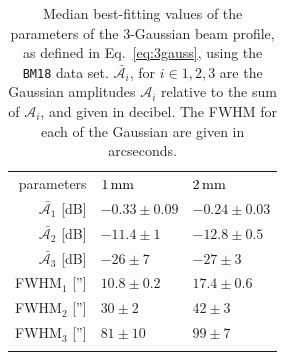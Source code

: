 \begin{table}[!th]
   \caption{{\lp Median best-fitting values of the parameters of the
  3-Gaussian beam profile, as defined in Eq.~\ref{eq:3gauss}, using
  the {\tt BM18} data set. $\bar{\mathcal{A}_i}$, for
  $i \in {1, 2, 3}$ are the Gaussian amplitudes $\mathcal{A}_i$ relative to the sum
  of $\mathcal{A}_i$, and given in decibel. The FWHM for each of the Gaussian are given in arcseconds.}}
  \label{tab:mean_3gauss_fit}
  \begin{center}
    \begin{tabular}{rll}
      \hline\hline
      \noalign{\smallskip}
       parameters  &  $1\,\rm{mm}$  & $2\,\rm{mm}$ \\
       \noalign{\smallskip} 
      \hline
      \noalign{\smallskip} 
      $\bar{\mathcal{A}_1}$ [dB] &   $-0.33 \pm 0.09$   &  $-0.24 \pm 0.03$ \\
      $\bar{\mathcal{A}_2}$ [dB] &   $-11.4 \pm 1$     &  $-12.8 \pm 0.5$   \\
      $\bar{\mathcal{A}_3}$ [dB] &   $-26 \pm 7$       &  $-27 \pm 3$    \\
      FWHM$_1$  ['']             &   $10.8 \pm 0.2$    &  $17.4 \pm 0.6 $ \\
      FWHM$_2$  ['']             &   $30 \pm 2$        &  $42 \pm 3 $ \\
      FWHM$_3$  ['']             &   $81 \pm 10$       &  $99 \pm 7 $ \\     
       \noalign{\smallskip}   
      \hline
    \end{tabular}    
  \end{center}
\end{table}
%

